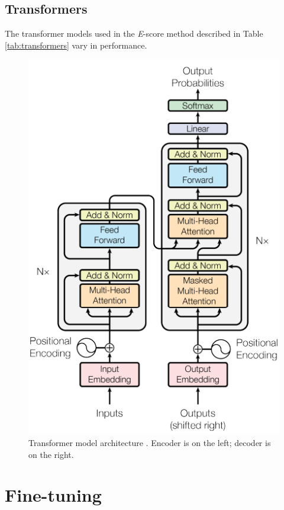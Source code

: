 \subsection{Transformers}
The \gls{transformer} models used in the \textit{E}-score method described in Table \ref{tab:transformers} vary in performance.

\begin{figure} %
    \begin{center}
	   \includegraphics[width=0.6\linewidth]{figures/transformer.png}
    \end{center}
	\caption{Transformer model architecture \cite{Vaswani:2017}. Encoder is on the left; decoder is on the right.}
    \vspace{-5mm}
	\label{fig:transformer}
\end{figure}

\section{Fine-tuning}
\fi